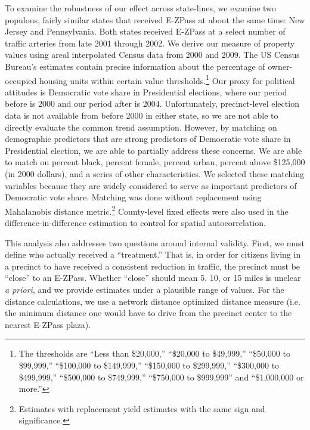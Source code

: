 \documentclass[11.0pt]{article}
\theoremstyle{definition}
\begin{document}
To examine the robustness of our effect across state-lines, we examine two populous, fairly similar states that received E-ZPass at about the same time: New Jersey and Pennsylvania. Both states received E-ZPass at a select number of traffic arteries from late 2001 through 2002. We derive our measure of property values using areal interpolated Census data from 2000 and 2009. The US Census Bureau's estimates contain precise information about the percentage of owner-occupied housing units within certain value thresholds.\footnote{The thresholds are ``Less than \$20,000,'' ``\$20,000 to \$49,999,'' ``\$50,000 to \$99,999,'' ``\$100,000 to \$149,999,'' ``\$150,000 to \$299,999,'' ``\$300,000 to \$499,999,'' ``\$500,000 to \$749,999,'' ``\$750,000 to \$999,999'' and ``\$1,000,000 or more.''} Our proxy for political attitudes is Democratic vote share in Presidential elections, where our period before is 2000 and our period after is 2004. Unfortunately, precinct-level election data is not available from before 2000 in either state, so we are not able to directly evaluate the common trend assumption. However, by matching on demographic predictors that are strong predictors of Democratic vote share in Presidential election, we are able to partially address these concerns. We are able to match on percent black, percent female, percent urban, percent above \$125,000 (in 2000 dollars), and a series of other characteristics. We selected these matching variables because they are widely considered to serve as important predictors of Democratic vote share. Matching was done without replacement using Mahalanobis distance metric.\footnote{Estimates with replacement yield estimates with the same sign and significance.} County-level fixed effects were also used in the difference-in-difference estimation to control for spatial autocorrelation. %

This analysis also addresses two questions around internal validity. First, we must define who actually received a ``treatment.'' That is, in order for citizens living in a precinct to have received a consistent reduction in traffic, the precinct must be ``close'' to an E-ZPass. Whether ``close'' should mean 5, 10, or 15 miles is unclear \emph{a priori}, and we provide estimates under a plausible range of values. For the distance calculations, we use a network distance optimized distance measure (i.e. the minimum distance one would have to drive from the precinct center to the nearest E-ZPass plaza). 
\end{document}
